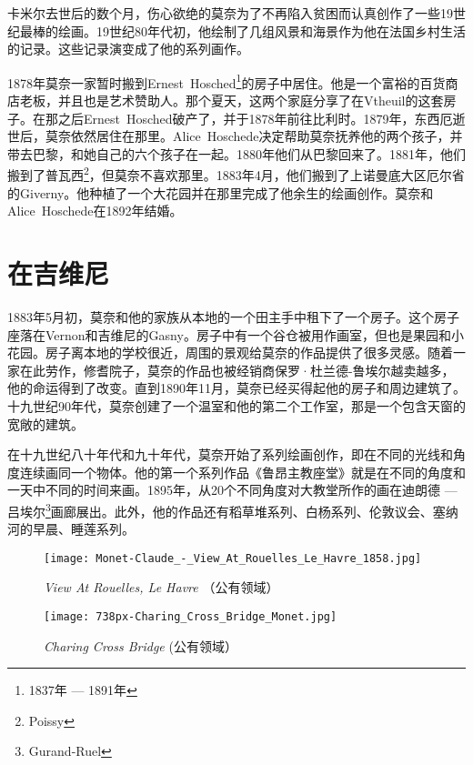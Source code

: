         卡米尔去世后的数个月，伤心欲绝的莫奈为了不再陷入贫困而认真创作了一些19世纪最棒的绘画。19世纪80年代初，他绘制了几组风景和海景作为他在法国乡村生活的记录。这些记录演变成了他的系列画作。
        
        1878年莫奈一家暂时搬到Ernest~Hosched\footnote{1837年 --- 1891年}的房子中居住。他是一个富裕的百货商店老板，并且也是艺术赞助人。那个夏天，这两个家庭分享了在Vtheuil的这套房子。在那之后Ernest~Hosched破产了，并于1878年前往比利时。1879年，东西厄逝世后，莫奈依然居住在那里。Alice~Hoschede决定帮助莫奈抚养他的两个孩子，并带去巴黎，和她自己的六个孩子在一起。1880年他们从巴黎回来了。1881年，他们搬到了普瓦西\footnote{Poissy}，但莫奈不喜欢那里。1883年4月，他们搬到了上诺曼底大区厄尔省的Giverny。他种植了一个大花园并在那里完成了他余生的绘画创作。莫奈和Alice~Hoschede在1892年结婚。
    
    \section{在吉维尼}
    
        1883年5月初，莫奈和他的家族从本地的一个田主手中租下了一个房子。这个房子座落在Vernon和吉维尼的Gasny。房子中有一个谷仓被用作画室，但也是果园和小花园。房子离本地的学校很近，周围的景观给莫奈的作品提供了很多灵感。随着一家在此劳作，修耆院子，莫奈的作品也被经销商保罗·杜兰德-鲁埃尔越卖越多，他的命运得到了改变。直到1890年11月，莫奈已经买得起他的房子和周边建筑了。十九世纪90年代，莫奈创建了一个温室和他的第二个工作室，那是一个包含天窗的宽敞的建筑。
        
        在十九世纪八十年代和九十年代，莫奈开始了系列绘画创作，即在不同的光线和角度连续画同一个物体。他的第一个系列作品《鲁昂主教座堂》就是在不同的角度和一天中不同的时间来画。1895年，从20个不同角度对大教堂所作的画在迪朗德 --- 吕埃尔\footnote{Gurand-Ruel}画廊展出。此外，他的作品还有稻草堆系列、白杨系列、伦敦议会、塞纳河的早晨、睡莲系列。

        \begin{figure}[h!]
          \begin{minipage}{0.5\textwidth}
              \centering
              \texttt{[image: Monet-Claude\_-\_View\_At\_Rouelles\_Le\_Havre\_1858.jpg]}
              \caption{\textit{View At Rouelles, Le Havre} （公有领域）}
              \label{fig:view-at-rouelles-le-havre}
          \end{minipage}
          \begin{minipage}{0.5\textwidth}
              \centering
              \texttt{[image: 738px-Charing\_Cross\_Bridge\_Monet.jpg]}
              \caption{\textit{Charing Cross Bridge}  (公有领域）}
              \label{fig:charing-cross-bridge}
          \end{minipage}
        \end{figure}
        

